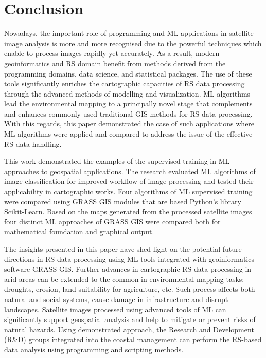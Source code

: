 \documentclass[final,5p,times,twocolumn]{elsarticle}
\numberwithin{table}{section}
\begin{document}
\section{Conclusion}

Nowadays, the important role of programming and ML applications in satellite image analysis is more and more recognised due to the powerful techniques which enable to process images rapidly yet accurately. As a result, modern geoinformatics and RS domain benefit from methods derived from the programming domains, data science, and statistical packages. The use of these tools significantly enriches the cartographic capacities of RS data processing through the advanced methods of modelling and visualization. ML algorithms lead the environmental mapping to a principally novel stage that complements and enhances commonly used traditional GIS methods for RS data processing. With this regards, this paper demonstrated the case of such applications where ML algorithms were applied and compared to address the issue of the effective RS data handling.

This work demonstrated the examples of the supervised training in ML approaches to geospatial applications. The research evaluated ML algorithms of image classification for improved workflow of image processing and tested their applicability in cartographic works. Four algorithms of ML supervised training were compared using GRASS GIS modules that are based Python's library Scikit-Learn. Based on the maps generated from the processed satellite images four distinct ML approaches of GRASS GIS were compared both for mathematical foundation and graphical output. 

The insights presented in this paper have shed light on the potential future directions in RS data processing using ML tools integrated with geoinformatics software GRASS GIS. Further advances in cartographic RS data processing in arid areas can be extended to the common in environmental mapping tasks:  droughts, erosion, land suitability for agriculture, etc. Such process affects both natural and social systems, cause damage in infrastructure and disrupt landscapes. Satellite images processed using advanced tools of ML can significantly support geospatial analysis and help to mitigate or prevent risks of natural hazards. Using demonstrated approach, the Research and Development (R\&D) groups integrated into the coastal management can perform the RS-based data analysis using programming and scripting methods.
\end{document}
